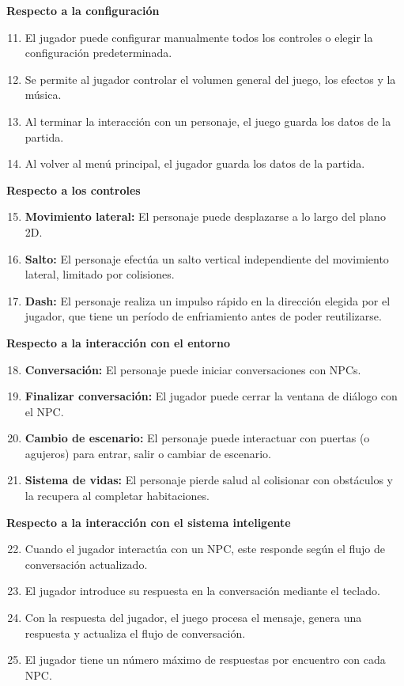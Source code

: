 \documentclass[12pt,twoside]{article}
\begin{document}
	\noindent\textbf{Respecto a la configuración}
	\begin{enumerate}[label=RF\arabic*]
		\setcounter{enumi}{10}
		\item El jugador puede configurar manualmente todos los controles o elegir la configuración predeterminada.
		\item Se permite al jugador controlar el volumen general del juego, los efectos y la música.
		\item Al terminar la interacción con un personaje, el juego guarda los datos de la partida.
		\item Al volver al menú principal, el jugador guarda los datos de la partida.
	\end{enumerate}
	
	\noindent\textbf{Respecto a los controles}
	\begin{enumerate}[label=RF\arabic*]
		\setcounter{enumi}{14}
		\item \textbf{Movimiento lateral: }El personaje puede desplazarse a lo largo del plano 2D.
		\item \textbf{Salto: }El personaje efectúa un salto vertical independiente del movimiento lateral, limitado por colisiones.
		\item \textbf{Dash: }El personaje realiza un impulso rápido en la dirección elegida por el jugador, que tiene un período de enfriamiento antes de poder reutilizarse.
	\end{enumerate}
	
	\noindent\textbf{Respecto a la interacción con el entorno}
	\begin{enumerate}[label=RF\arabic*]
		\setcounter{enumi}{17}
		\item \textbf{Conversación: }El personaje puede iniciar conversaciones con NPCs.
		\item \textbf{Finalizar conversación:} El jugador puede cerrar la ventana de diálogo con el NPC.
		\item \textbf{Cambio de escenario: }El personaje puede interactuar con puertas (o agujeros) para entrar, salir o cambiar de escenario.
		\item \textbf{Sistema de vidas: }El personaje pierde salud al colisionar con obstáculos y la recupera al completar habitaciones.
	\end{enumerate}
	
	\noindent\textbf{Respecto a la interacción con el sistema inteligente}
	\begin{enumerate}[label=RF\arabic*]
		\setcounter{enumi}{21}
		\item Cuando el jugador interactúa con un NPC, este responde según el flujo de conversación actualizado.
		\item El jugador introduce su respuesta en la conversación mediante el teclado.
		\item Con la respuesta del jugador, el juego procesa el mensaje, genera una respuesta y actualiza el flujo de conversación.
		\item El jugador tiene un número máximo de respuestas por encuentro con cada NPC.
		
	\end{enumerate}
	
\end{document}

